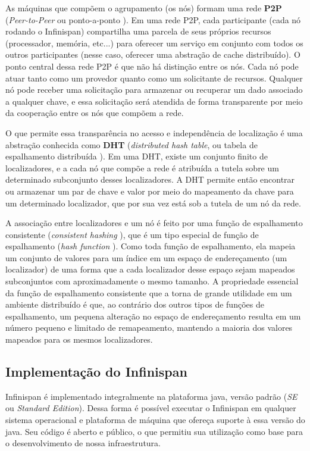 \documentclass[11pt,twoside,a4paper]{book}
\begin{document}
As máquinas que compõem o agrupamento (os nós) formam uma rede \textbf{P2P} (\emph{Peer-to-Peer} ou ponto-a-ponto \cite{p2p}). Em uma rede P2P, cada participante (cada nó rodando o Infinispan) compartilha uma parcela de seus próprios recursos (processador, memória, 
etc...) para oferecer um serviço em conjunto com todos os outros participantes (nesse caso, oferecer uma abstração de cache distribuído).
O ponto central dessa rede P2P é que não há distinção entre os nós. Cada nó pode atuar tanto como um provedor quanto como um solicitante de recursos. Qualquer nó pode receber uma solicitação para armazenar ou recuperar um dado associado a qualquer chave, e essa solicitação será atendida de forma transparente por meio da cooperação entre os nós que compõem a rede.

O que permite essa transparência no acesso e independência de localização é uma abstração conhecida como \textbf{DHT} (\emph{distributed hash table}, ou tabela de espalhamento distribuída \cite{dht}). Em uma DHT, existe um conjunto finito de localizadores, e a cada nó que compõe a rede é atribuída a tutela sobre um determinado subconjunto desses localizadores. A DHT permite então encontrar ou armazenar um par de chave e valor por meio do mapeamento da chave para um determinado localizador, que por sua vez está sob a tutela de um nó da rede.

A associação entre localizadores e um nó é feito por uma função de espalhamento consistente (\emph{consistent hashing} \cite{consistent_hashing}), que é um tipo especial de função de espalhamento (\emph{hash function} \cite{taocp_3}). Como toda função de espalhamento, ela mapeia um conjunto de valores para um índice em um espaço de endereçamento (um localizador) de uma forma que a cada localizador desse espaço sejam mapeados subconjuntos com aproximadamente o mesmo tamanho. A propriedade essencial da função de espalhamento consistente que a torna de grande utilidade em um ambiente distribuído é que, ao contrário dos outros tipos de funções de espalhamento, um pequena alteração no espaço de endereçamento resulta em um número pequeno e limitado de remapeamento, mantendo a maioria dos valores mapeados para os mesmos localizadores.

\subsection{Implementação do Infinispan}
\label{sec:implementacao_infinispan}
Infinispan é implementado integralmente na plataforma java, versão padrão (\emph{SE} ou \emph{Standard Edition}). Dessa forma é possível executar o Infinispan em qualquer sistema operacional e plataforma de máquina que ofereça suporte à essa versão do java. Seu código é aberto e público, o que permitiu sua utilização como base para o desenvolvimento de nossa infraestrutura.
\end{document}
